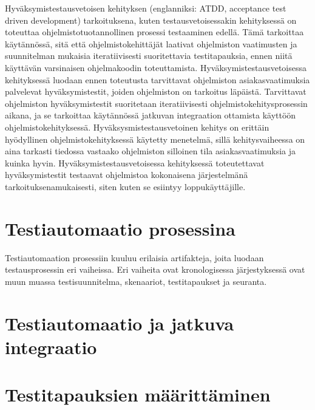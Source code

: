 Hyväksymistestausvetoisen kehityksen (englanniksi: ATDD, acceptance test driven development) tarkoituksena, kuten testausvetoisessakin kehityksessä on toteuttaa ohjelmistotuotannollinen prosessi testaaminen edellä.
Tämä tarkoittaa käytännössä, sitä että ohjelmistokehittäjät laativat ohjelmiston vaatimusten ja suunnitelman mukaisia iteratiivisesti suoritettavia testitapauksia, ennen niitä käyttävän varsinaisen ohjelmakoodin toteuttamista.
Hyväksymistestausvetoisessa kehityksessä luodaan ennen toteutusta tarvittavat ohjelmiston asiakasvaatimuksia palvelevat hyväksymistestit, joiden ohjelmiston on tarkoitus läpäistä.
Tarvittavat ohjelmiston hyväksymistestit suoritetaan iteratiivisesti ohjelmistokehitysprosessin aikana, ja se tarkoittaa käytännössä jatkuvan integraation ottamista käyttöön ohjelmistokehityksessä.
Hyväksysmistestausvetoinen kehitys on erittäin hyödyllinen ohjelmistokehityksessä käytetty menetelmä, sillä kehitysvaiheessa on aina tarkasti tiedossa vastaako ohjelmiston silloinen tila asiakasvaatimuksia ja kuinka hyvin.
Hyväksymistestausvetoisessa kehityksessä toteutettavat hyväksymistestit testaavat ohjelmistoa kokonaisena järjestelmänä tarkoituksenamukaisesti, siten kuten se esiintyy loppukäyttäjille.

\section{Testiautomaatio prosessina}

Testiautomaation prosessiin kuuluu erilaisia artifakteja, joita luodaan testausprosessin eri vaiheissa.
Eri vaiheita ovat kronologisessa järjestyksessä ovat muun muassa testisuunnitelma, skenaariot, testitapaukset ja seuranta.

\section{Testiautomaatio ja jatkuva integraatio}

\section{Testitapauksien määrittäminen}

